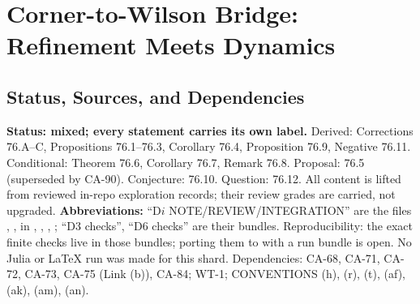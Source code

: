 
\section{Corner-to-Wilson Bridge: Refinement Meets Dynamics}
\label{sec:corner-to-wilson-bridge}

\subsection{Status, Sources, and Dependencies}

\textbf{Status: mixed; every statement carries its own label.}  Derived: Corrections 76.A--C, Propositions 76.1--76.3,
Corollary 76.4, Proposition 76.9, Negative 76.11.  Conditional: Theorem 76.6, Corollary 76.7, Remark 76.8.  Proposal: 76.5 (superseded by CA-90).
Conjecture: 76.10.  Question: 76.12.  All content is lifted from reviewed in-repo exploration records; their review grades
are carried, not upgraded.  \textbf{Abbreviations:} ``D\(i\) NOTE/REVIEW/INTEGRATION'' are the files ,
,  in ,
, ,
; ``D3 checks'', ``D6 checks'' are their  bundles.
Reproducibility: the exact finite checks live in those bundles; porting them to  with a run bundle is open.
No Julia or \LaTeX{} run was made for this shard.
Dependencies: CA-68, CA-71, CA-72, CA-73, CA-75 (Link (b)), CA-84; WT-1; CONVENTIONS (h), (r), (t), (af), (ak), (am), (an).

